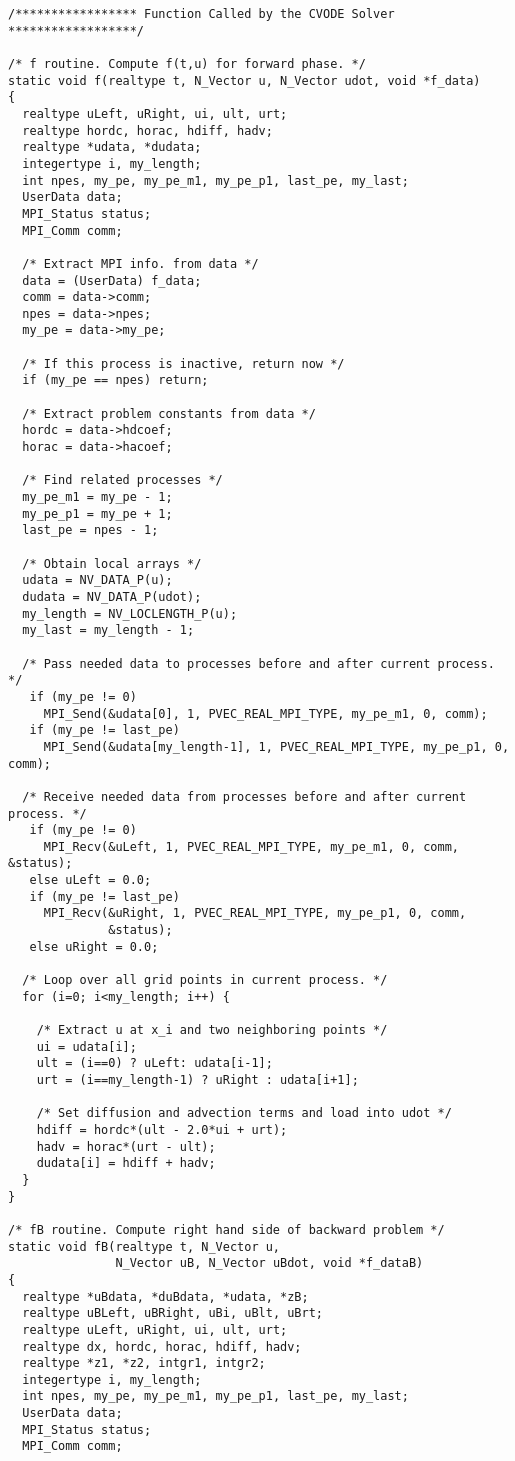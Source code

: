 \begin{verbatim}
/***************** Function Called by the CVODE Solver ******************/

/* f routine. Compute f(t,u) for forward phase. */
static void f(realtype t, N_Vector u, N_Vector udot, void *f_data)
{
  realtype uLeft, uRight, ui, ult, urt;
  realtype hordc, horac, hdiff, hadv;
  realtype *udata, *dudata;
  integertype i, my_length;
  int npes, my_pe, my_pe_m1, my_pe_p1, last_pe, my_last;
  UserData data;
  MPI_Status status;
  MPI_Comm comm;

  /* Extract MPI info. from data */
  data = (UserData) f_data;
  comm = data->comm;
  npes = data->npes;
  my_pe = data->my_pe;
  
  /* If this process is inactive, return now */
  if (my_pe == npes) return;

  /* Extract problem constants from data */
  hordc = data->hdcoef;
  horac = data->hacoef;

  /* Find related processes */
  my_pe_m1 = my_pe - 1;
  my_pe_p1 = my_pe + 1;
  last_pe = npes - 1;

  /* Obtain local arrays */
  udata = NV_DATA_P(u);
  dudata = NV_DATA_P(udot);
  my_length = NV_LOCLENGTH_P(u);
  my_last = my_length - 1;

  /* Pass needed data to processes before and after current process. */
   if (my_pe != 0)
     MPI_Send(&udata[0], 1, PVEC_REAL_MPI_TYPE, my_pe_m1, 0, comm);
   if (my_pe != last_pe)
     MPI_Send(&udata[my_length-1], 1, PVEC_REAL_MPI_TYPE, my_pe_p1, 0, comm);   

  /* Receive needed data from processes before and after current process. */
   if (my_pe != 0)
     MPI_Recv(&uLeft, 1, PVEC_REAL_MPI_TYPE, my_pe_m1, 0, comm, &status);
   else uLeft = 0.0;
   if (my_pe != last_pe)
     MPI_Recv(&uRight, 1, PVEC_REAL_MPI_TYPE, my_pe_p1, 0, comm,
              &status);   
   else uRight = 0.0;

  /* Loop over all grid points in current process. */
  for (i=0; i<my_length; i++) {

    /* Extract u at x_i and two neighboring points */
    ui = udata[i];
    ult = (i==0) ? uLeft: udata[i-1];
    urt = (i==my_length-1) ? uRight : udata[i+1];

    /* Set diffusion and advection terms and load into udot */
    hdiff = hordc*(ult - 2.0*ui + urt);
    hadv = horac*(urt - ult);
    dudata[i] = hdiff + hadv;
  }
}

/* fB routine. Compute right hand side of backward problem */
static void fB(realtype t, N_Vector u, 
               N_Vector uB, N_Vector uBdot, void *f_dataB)
{
  realtype *uBdata, *duBdata, *udata, *zB;
  realtype uBLeft, uBRight, uBi, uBlt, uBrt;
  realtype uLeft, uRight, ui, ult, urt;
  realtype dx, hordc, horac, hdiff, hadv;
  realtype *z1, *z2, intgr1, intgr2;
  integertype i, my_length;
  int npes, my_pe, my_pe_m1, my_pe_p1, last_pe, my_last;
  UserData data;
  MPI_Status status;
  MPI_Comm comm;


\end{verbatim}
